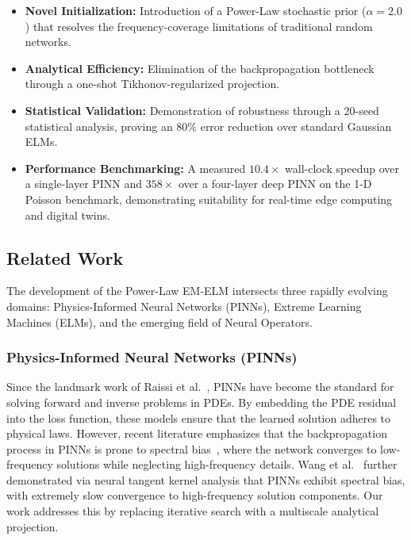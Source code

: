 \documentclass[final,12pt,3p,times,fleqn]{elsarticle}
\begin{document}
\begin{itemize}
    \item \textbf{Novel Initialization:} Introduction of a Power-Law stochastic prior ($\alpha=2.0$) that resolves the frequency-coverage limitations of traditional random networks.
    \item \textbf{Analytical Efficiency:} Elimination of the backpropagation bottleneck through a one-shot Tikhonov-regularized projection.
    \item \textbf{Statistical Validation:} Demonstration of robustness through a 20-seed statistical analysis, proving an $80\%$ error reduction over standard Gaussian ELMs.
    \item \textbf{Performance Benchmarking:} A measured $10.4\times$ wall-clock speedup over a single-layer PINN and $358\times$ over a four-layer deep PINN on the 1-D Poisson benchmark, demonstrating suitability for real-time edge computing and digital twins.
\end{itemize}

\subsection{Related Work}

The development of the Power-Law EM-ELM intersects three rapidly evolving domains: Physics-Informed Neural Networks (PINNs), Extreme Learning Machines (ELMs), and the emerging field of Neural Operators.

\subsubsection{Physics-Informed Neural Networks (PINNs)}

Since the landmark work of Raissi et al.~\cite{raissi2019physics}, PINNs have become the standard for solving forward and inverse problems in PDEs. By embedding the PDE residual into the loss function, these models ensure that the learned solution adheres to physical laws. However, recent literature emphasizes that the backpropagation process in PINNs is prone to spectral bias~\cite{rahaman2019spectral,basri2020frequency}, where the network converges to low-frequency solutions while neglecting high-frequency details. Wang et al.~\cite{wang2022pinns} further demonstrated via neural tangent kernel analysis that PINNs exhibit spectral bias, with extremely slow convergence to high-frequency solution components. Our work addresses this by replacing iterative search with a multiscale analytical projection.
\end{document}
